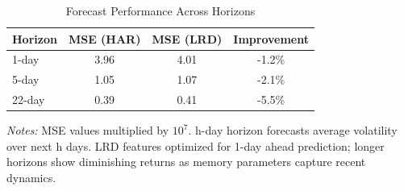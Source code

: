 \begin{table}[htbp]
\centering
\caption{Forecast Performance Across Horizons}
\label{tab:horizons}
\small
\begin{tabular}{lccc}
\toprule
Horizon & MSE (HAR) & MSE (LRD) & Improvement \\
\midrule
1-day & 3.96 & 4.01 & -1.2\% \\
5-day & 1.05 & 1.07 & -2.1\% \\
22-day & 0.39 & 0.41 & -5.5\% \\
\bottomrule
\end{tabular}
\begin{tablenotes}\small
\item \textit{Notes:} MSE values multiplied by $10^7$. h-day horizon forecasts average volatility over next h days. LRD features optimized for 1-day ahead prediction; longer horizons show diminishing returns as memory parameters capture recent dynamics.
\end{tablenotes}
\end{table}
